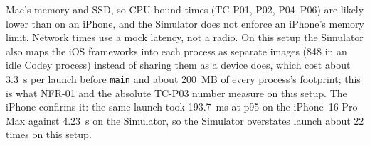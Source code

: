 \documentclass[12pt,letterpaper]{article}
\begin{document}
\begin{itemize}
        Mac's memory and SSD, so CPU-bound times (TC-P01, P02, P04--P06) are likely
        lower than on an iPhone, and the Simulator does not enforce an iPhone's memory
        limit. Network times use a mock latency, not a radio. On this setup the
        Simulator also maps the iOS frameworks into each process as separate images
        (848 in an idle Codey process) instead of sharing them as a device does,
        which cost about 3.3~s per launch before \texttt{main} and about 200~MB of
        every process's footprint; this is what NFR-01 and the absolute TC-P03
        number measure on this setup. The iPhone confirms it: the same launch
        took 193.7~ms at p95 on the iPhone~16 Pro Max against 4.23~s on the
        Simulator, so the Simulator overstates launch about 22 times on this setup.
\end{itemize}
\end{document}
